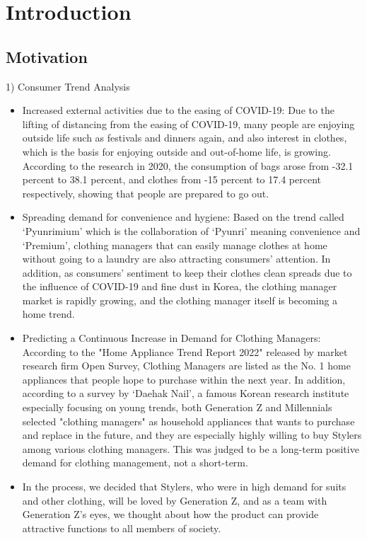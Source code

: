 \documentclass[conference]{IEEEtran}
\begin{document}
\section{Introduction}
\subsection{Motivation}
1) Consumer Trend Analysis
\begin{itemize}
    \item Increased external activities due to the easing of COVID-19: Due to the lifting of distancing from the easing of COVID-19, many people are enjoying outside life such as festivals and dinners again, and also interest in clothes, which is the basis for enjoying outside and out-of-home life, is growing. According to the research in 2020, the consumption of bags arose from -32.1 percent to 38.1 percent, and clothes from -15 percent to 17.4 percent respectively, showing that people are prepared to go out.\\
    \item Spreading demand for convenience and hygiene: Based on the trend called ‘Pyunrimium’ which is the collaboration of ‘Pyunri’ meaning convenience and ‘Premium’, clothing managers that can easily manage clothes at home without going to a laundry are also attracting consumers' attention. In addition, as consumers' sentiment to keep their clothes clean spreads due to the influence of COVID-19 and fine dust in Korea, the clothing manager market is rapidly growing, and the clothing manager itself is becoming a home trend.\\
    \item Predicting a Continuous Increase in Demand for Clothing Managers: According to the "Home Appliance Trend Report 2022" released by market research firm Open Survey, Clothing Managers are listed as the No. 1 home appliances that people hope to purchase within the next year. In addition, according to a survey by ‘Daehak Nail’, a famous Korean research institute especially focusing on young trends, both Generation Z and Millennials selected "clothing managers" as household appliances that wants to purchase and replace in the future, and they are especially highly willing to buy Stylers among various clothing managers. This was judged to be a long-term positive demand for clothing management, not a short-term.\\
    \item In the process, we decided that Stylers, who were in high demand for suits and other clothing, will be loved by Generation Z, and as a team with Generation Z's eyes, we thought about how the product can provide attractive functions to all members of society.\\
\end{itemize}
\end{document}
